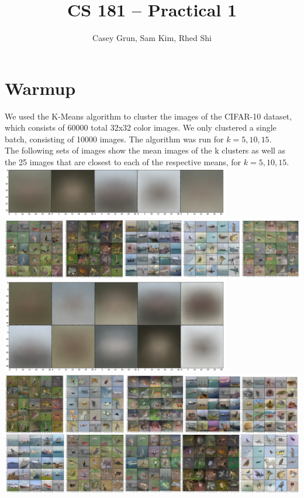 \documentclass[11pt]{amsart}
\title{CS 181 -- Practical 1}
\author{Casey Grun, Sam Kim, Rhed Shi}
\begin{document}
\maketitle

\section{Warmup}
We used the K-Means algorithm to cluster the images of the CIFAR-10 dataset, which consists of 60000 total 32x32 color images. We only clustered a single batch, consisting of 10000 images. The algorithm was run for $k=5,10,15$.\\
The following sets of images show the mean images of the k clusters as well as the 25 images that are closest to each of the respective means, for $k=5,10,15$.\\

\includegraphics[width=10cm]{images/k5us.png}\\
\includegraphics[width=15cm]{images/k5reps.png}\\

\includegraphics[width=10cm]{images/k10us.png}\\
\includegraphics[width=15cm]{images/k10reps.png}\\
\end{document}
